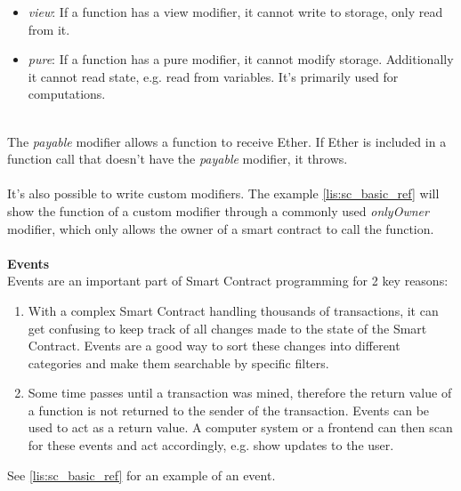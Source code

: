 \begin{itemize}
  \item \textit{view}: If a function has a view modifier, it cannot write to storage, only read from it.
  \item \textit{pure}: If a function has a pure modifier, it cannot modify storage. Additionally it cannot read state, e.g. read from variables. It’s primarily used for computations.
\end{itemize}
\leavevmode
\\
The \textit{payable} modifier allows a function to receive Ether. If Ether is included in a function call that doesn’t have the \textit{payable} modifier, it throws.
\\\\
It’s also possible to write custom modifiers. The example \ref{lis:sc_basic_ref} will show the function of a custom modifier through a commonly used \textit{onlyOwner} modifier, which only allows the owner of a smart contract to call the function.
\\\\
\textbf{Events}\\
Events are an important part of Smart Contract programming for 2 key reasons:
\begin{enumerate}
  \item With a complex Smart Contract handling thousands of transactions, it can get confusing to keep track of all changes made to the state of the Smart Contract. Events are a good way to sort these changes into different categories and make them searchable by specific filters.
  \item Some time passes until a transaction was mined, therefore the return value of a function is not returned to the sender of the transaction. Events can be used to act as a return value. A computer system or a frontend can then scan for these events and act accordingly, e.g. show updates to the user.  
\end{enumerate}
See \ref{lis:sc_basic_ref} for an example of an event.
\\\\
